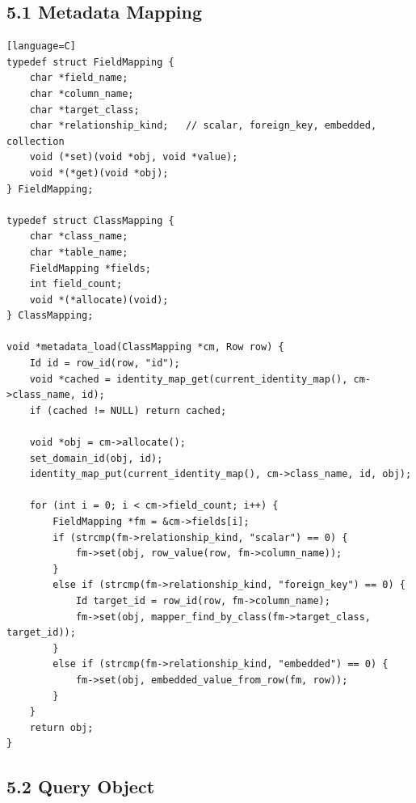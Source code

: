\documentclass[11pt]{article}
\begin{document}
\subsection{5.1 Metadata Mapping}\label{metadata-mapping}

\begin{verbatim}[language=C]
typedef struct FieldMapping {
    char *field_name;
    char *column_name;
    char *target_class;
    char *relationship_kind;   // scalar, foreign_key, embedded, collection
    void (*set)(void *obj, void *value);
    void *(*get)(void *obj);
} FieldMapping;

typedef struct ClassMapping {
    char *class_name;
    char *table_name;
    FieldMapping *fields;
    int field_count;
    void *(*allocate)(void);
} ClassMapping;

void *metadata_load(ClassMapping *cm, Row row) {
    Id id = row_id(row, "id");
    void *cached = identity_map_get(current_identity_map(), cm->class_name, id);
    if (cached != NULL) return cached;

    void *obj = cm->allocate();
    set_domain_id(obj, id);
    identity_map_put(current_identity_map(), cm->class_name, id, obj);

    for (int i = 0; i < cm->field_count; i++) {
        FieldMapping *fm = &cm->fields[i];
        if (strcmp(fm->relationship_kind, "scalar") == 0) {
            fm->set(obj, row_value(row, fm->column_name));
        }
        else if (strcmp(fm->relationship_kind, "foreign_key") == 0) {
            Id target_id = row_id(row, fm->column_name);
            fm->set(obj, mapper_find_by_class(fm->target_class, target_id));
        }
        else if (strcmp(fm->relationship_kind, "embedded") == 0) {
            fm->set(obj, embedded_value_from_row(fm, row));
        }
    }
    return obj;
}
\end{verbatim}

\subsection{5.2 Query Object}\label{query-object}
\end{document}

